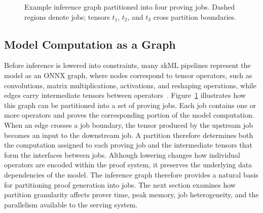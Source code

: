 \begin{figure}[t]
\centering
\scriptsize
{}
\caption{
Example inference graph partitioned into four proving jobs. Dashed regions denote jobs; tensors \(t_1\), \(t_2\), and \(t_3\) cross partition boundaries.
}
\label{fig:prover-job-graph}
\end{figure}


\subsection{Model Computation as a Graph}
\label{sec:model-graph}
Before inference is lowered into constraints, many zkML pipelines represent the model as an ONNX graph, where nodes correspond to tensor operators, such as convolutions, matrix multiplications, activations, and reshaping operations, while edges carry intermediate tensors between operators~\cite{onnx-paper}. Figure~\ref{fig:prover-job-graph} illustrates how this graph can be partitioned into a set of proving jobs. Each job contains one or more operators and proves the corresponding portion of the model computation. When an edge crosses a job boundary, the tensor produced by the upstream job becomes an input to the downstream job. A partition therefore determines both the computation assigned to each proving job and the intermediate tensors that form the interfaces between jobs. Although lowering changes how individual operators are encoded within the proof system, it preserves the underlying data dependencies of the model. The inference graph therefore provides a natural basis for partitioning proof generation into jobs. The next section examines how partition granularity affects prover time, peak memory, job heterogeneity, and the parallelism available to the serving system.



